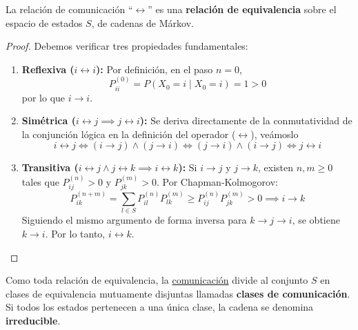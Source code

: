 \begin{prop}
    La relación de comunicación ``$\longleftrightarrow$'' es una \textbf{relación de equivalencia} sobre el espacio de estados $S$, de cadenas de Márkov.

\begin{proof}
    Debemos verificar tres propiedades fundamentales:
    \begin{enumerate}
        \item \textbf{Reflexiva ($i \longleftrightarrow i$):} Por definición, en el paso $n=0$, 
        $$P_{ii}^{(0)} = P(X_0 = i \mid X_0 = i) = 1 > 0$$ 
        por lo que $i \to i$.
        \item \textbf{Simétrica ($i \longleftrightarrow j \implies j \longleftrightarrow i$):} Se deriva directamente de la conmutatividad de la conjunción lógica en la definición del operador ($\longleftrightarrow$), veámoslo
        \begin{equation*}
            i \longleftrightarrow j \iff (i \to j) \land (j \to i) \iff (j \to i) \land (i \to j) \iff j \longleftrightarrow i
        \end{equation*}
        \item \textbf{Transitiva ($i \longleftrightarrow j \land j \longleftrightarrow k \implies i \longleftrightarrow k$):} 
        Si $i \to j$ y $j \to k$, existen $n, m \geq 0$ tales que $P_{ij}^{(n)} > 0$ y $P_{jk}^{(m)} > 0$. Por Chapman-Kolmogorov:
        \[
        P_{ik}^{(n+m)} = \sum_{l \in S} P_{il}^{(n)}P_{lk}^{(m)} \geq P_{ij}^{(n)}P_{jk}^{(m)} > 0 \implies i \to k
        \]
        Siguiendo el mismo argumento de forma inversa para $k \to j \to i$, se obtiene $k \to i$. Por lo tanto, $i \longleftrightarrow k$.
    \end{enumerate}
\end{proof}
\end{prop}



\begin{observacion}
    Como toda relación de equivalencia, la \underline{comunicación} divide al conjunto $S$ en clases de equivalencia mutuamente disjuntas llamadas \textbf{clases de comunicación}. Si todos los estados pertenecen a una única clase, la cadena se denomina \textbf{irreducible}.
\end{observacion}


